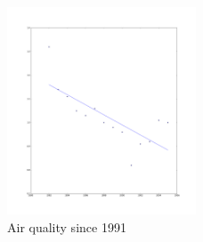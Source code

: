 \documentclass{amsart}
\begin{document}
\begin{figure}[h]
\centering
\includegraphics[width=0.5\textwidth]{img/air_quality_1991}
\caption{Air quality since 1991}
\end{figure}
\end{document}
